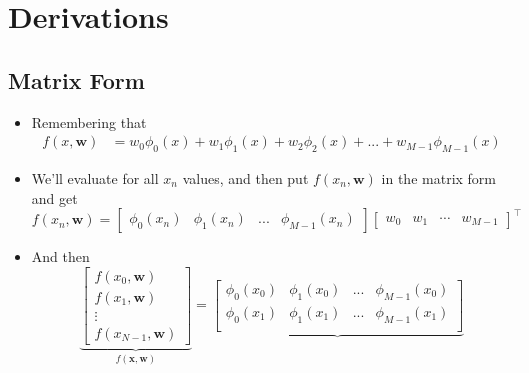 \newpage
\section*{\appendixname}
\appendix

\section{Derivations}
\subsection{Matrix Form}
\label{app:matrix-form}

\begin{itemize}
    \item Remembering that
        \begin{align*}
            f(x,\mathbf{w}) &= w_0 \phi_0(x) +w_1 \phi_1(x) +w_2 \phi_2(x)  + ... + w_{M-1} \phi_{M-1}(x) 
        \end{align*}
    \item We'll evaluate for all $x_n$ values, and then put $f(x_n,\mathbf{w})$ in the matrix form and get
    \begin{equation*}
        f(x_n,\mathbf{w})=
        \begin{bmatrix}
            \phi_0(x_n) & \phi_1(x_n) & ... & \phi_{M-1}(x_n)
        \end{bmatrix}
        \begin{bmatrix}
            w_0 & w_1 &  \cdots & w_{M-1}
        \end{bmatrix}^{\top}
    \end{equation*}
    \item And then
    \begin{equation*}
        \underbrace{
            \begin{bmatrix}
                f(x_0,\mathbf{w}) \\ f(x_1,\mathbf{w}) \\  \vdots \\ f(x_{N-1},\mathbf{w})
            \end{bmatrix}
        }_{f(\mathbf{x},\mathbf{w})} = 
        \underbrace{
            \begin{bmatrix}
            \phi_0(x_0) & \phi_1(x_0) & ... & \phi_{M-1}(x_0)   \\ 
            \phi_0(x_1) & \phi_1(x_1) & ... & \phi_{M-1}(x_1)    \\ 

\end{bmatrix}}
\end{equation*}
\end{itemize}
